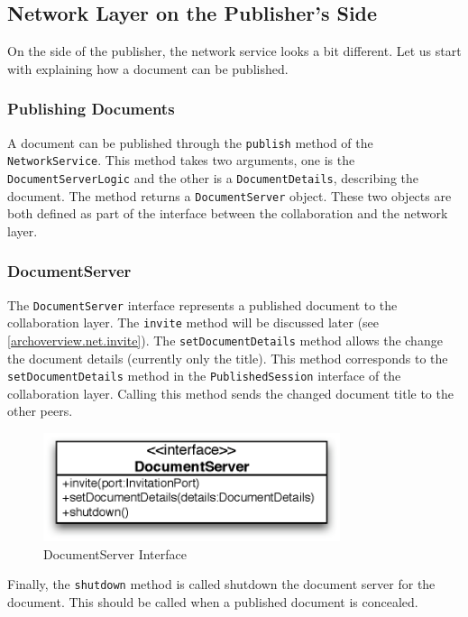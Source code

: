\subsection{Network Layer on the Publisher's Side}
On the side of the publisher, the network service looks a bit different.
Let us start with explaining how a document can be published.

\subsubsection{Publishing Documents}
A document can be published through the \texttt{publish} method of the
\texttt{NetworkService}. This method takes two arguments, one is the
\texttt{DocumentServerLogic} and the other is a \texttt{DocumentDetails},
describing the document. The method returns a \texttt{DocumentServer}
object. These two objects are both defined as part of the interface between the
collaboration and the network layer.

\subsubsection{DocumentServer}
The \texttt{DocumentServer} interface 
represents a published document to the collaboration layer. The
\texttt{invite} method will be discussed later 
(see \ref{archoverview.net.invite}). The \texttt{setDocumentDetails}
method allows the change the document details (currently only the title).
This method corresponds to the \texttt{setDocumentDetails} method in
the \texttt{PublishedSession} interface of the collaboration layer.
Calling this method sends the changed document title to the other peers.

\begin{figure}[H]
 \centering
 \includegraphics[width=8.71cm,height=3.18cm]{../images/finalreport/architecture_documentserver_uml.eps}
 \caption{DocumentServer Interface}
\end{figure}

Finally, the \texttt{shutdown} method is called shutdown the document
server for the document. This should be called when a published document
is concealed.


